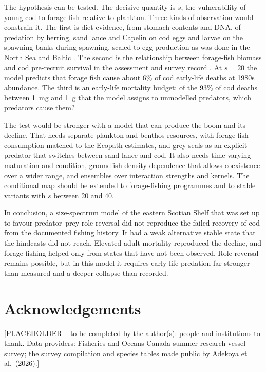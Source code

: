 \documentclass[12pt,letterpaper,fleqn]{article}
\begin{document}
The hypothesis can be tested. The decisive quantity is $s$, the vulnerability of young cod to forage fish relative to plankton. Three kinds of observation would constrain it. The first is diet evidence, from stomach contents and DNA, of predation by herring, sand lance and Capelin on cod eggs and larvae on the spawning banks during spawning, scaled to egg production as was done in the North Sea and Baltic \autocite{daan1985predation,koster2000trophodynamic,neumann2017quantifying}. The second is the relationship between forage-fish biomass and cod pre-recruit survival in the assessment and survey record \autocite{swain2012forage,minto2012interactions}. At $s=20$ the model predicts that forage fish cause about 6\% of cod early-life deaths at 1980s abundance. The third is an early-life mortality budget: of the 93\% of cod deaths between 1~mg and 1~g that the model assigns to unmodelled predators, which predators cause them?

The test would be stronger with a model that can produce the boom and its decline. That needs separate plankton and benthos resources, with forage-fish consumption matched to the Ecopath estimates, and grey seals as an explicit predator that switches between sand lance and cod. It also needs time-varying maturation and condition, groundfish density dependence that allows coexistence over a wider range, and ensembles over interaction strengths and kernels. The conditional map should be extended to forage-fishing programmes and to stable variants with $s$ between 20 and 40.

In conclusion, a size-spectrum model of the eastern Scotian Shelf that was set up to favour predator--prey role reversal did not reproduce the failed recovery of cod from the documented fishing history. It had a weak alternative stable state that the hindcasts did not reach. Elevated adult mortality reproduced the decline, and forage fishing helped only from states that have not been observed. Role reversal remains possible, but in this model it requires early-life predation far stronger than measured and a deeper collapse than recorded.

\section*{Acknowledgements}
[PLACEHOLDER -- to be completed by the author(s): people and institutions to thank. Data providers: Fisheries and Oceans Canada summer research-vessel survey; the survey compilation and species tables made public by Adekoya et al.\ (2026).]
\end{document}
